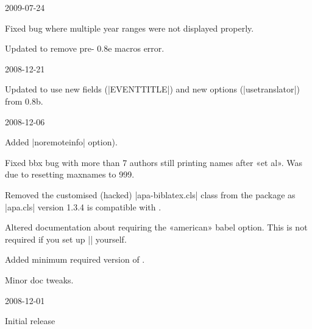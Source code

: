 \documentclass{ltxdockit}
\begin{document}
\begin{changelog}
\begin{release}{0.4}{2009-07-24}
\item Fixed bug where multiple year ranges were not displayed properly.
\item Updated to remove pre- 0.8e macros error.
\end{release}

\begin{release}{0.3}{2008-12-21}
\item Updated to use new fields (|EVENTTITLE|) and new options
  (|usetranslator|) from  0.8b.
\end{release}

\begin{release}{0.2}{2008-12-06}
\item Added |noremoteinfo| option).
\item Fixed bbx bug with more than 7 authors still printing names after «et al». Was
  due to resetting maxnames to 999.
\item Removed the customised (hacked) |apa-biblatex.cls| class from the package as
  |apa.cls| version 1.3.4 is compatible with .
\item Altered documentation about requiring the «american» babel option.
  This is not required if you set up |\DeclareQuotePunctuation| yourself.
\item Added minimum required version of .
\item Minor doc tweaks.
\end{release}

\begin{release}{0.1}{2008-12-01}
\item Initial release
\end{release}



\end{changelog}
\end{document}
